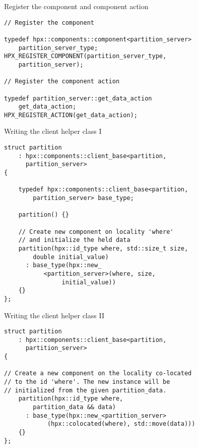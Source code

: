 \documentclass[\classoption]{beamer}
\begin{document}
\begin{frame}[fragile]{Register the component and component action}

\begin{lstlisting}
// Register the component

typedef hpx::components::component<partition_server> 
    partition_server_type;
HPX_REGISTER_COMPONENT(partition_server_type, 
    partition_server);

// Register the component action

typedef partition_server::get_data_action
    get_data_action;
HPX_REGISTER_ACTION(get_data_action);
\end{lstlisting}

\end{frame}


\begin{frame}[fragile]{Writing the client helper class I}

\begin{lstlisting}
struct partition 
	: hpx::components::client_base<partition, 
	  partition_server>
{

    typedef hpx::components::client_base<partition, 
        partition_server> base_type;
        
    partition() {}

    // Create new component on locality 'where' 
    // and initialize the held data
    partition(hpx::id_type where, std::size_t size, 
        double initial_value)
      : base_type(hpx::new_
           <partition_server>(where, size, 
                initial_value))
    {}
};
\end{lstlisting}

\end{frame}

\begin{frame}[fragile]{Writing the client helper class II}

\begin{lstlisting}
struct partition 
	: hpx::components::client_base<partition, 
	  partition_server>
{

// Create a new component on the locality co-located 
// to the id 'where'. The new instance will be 
// initialized from the given partition_data.
    partition(hpx::id_type where, 
        partition_data && data)
      : base_type(hpx::new_<partition_server>
            (hpx::colocated(where), std::move(data)))
    {}
};
\end{lstlisting}

\end{frame}
\end{document}
